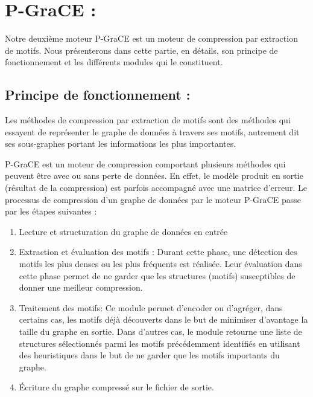 \documentclass[a4paper,oneside,12pt]{report}
\theoremstyle{definition}
\begin{document}
			
	
	
	
	\section{P-GraCE :}
	
	Notre deuxième moteur \gls{P-GraCE} est un moteur de compression par extraction de motifs. Nous présenterons dans cette partie, en détails, son principe de fonctionnement et les différents modules qui le constituent.
	
		\subsection{Principe de fonctionnement :}
		
		Les méthodes de compression par extraction de motifs sont des méthodes qui essayent de représenter le graphe de données à travers ses motifs, autrement dit ses sous-graphes portant les informations les plus importantes. 
		
		P-GraCE est un moteur de compression comportant plusieurs méthodes qui peuvent être avec ou sans perte de données. 
		En effet, le modèle produit en sortie (résultat de la compression) est parfois accompagné avec une matrice d'erreur. Le processus de compression d'un graphe de données par le moteur P-GraCE passe par les étapes suivantes :
		
\begin{enumerate}

\item Lecture et structuration du graphe de données en entrée 

\item Extraction et évaluation des motifs : Durant cette phase, une détection des motifs les plus denses ou les plus fréquents est réalisée. Leur évaluation dans cette phase permet de ne garder que les structures (motifs) susceptibles de donner une meilleur compression.

\item Traitement des motifs: Ce module permet d'encoder ou d'agréger, dans certains cas, les motifs déjà découverts dans le but de minimiser d'avantage la taille du graphe en sortie. Dans d'autres cas, le module retourne une liste de structures sélectionnés parmi les motifs précédemment identifiés en utilisant des heuristiques dans le but de ne garder que les motifs importants du graphe. %

\item Écriture du graphe compressé sur le fichier de sortie.
\end{enumerate}
\end{document}
